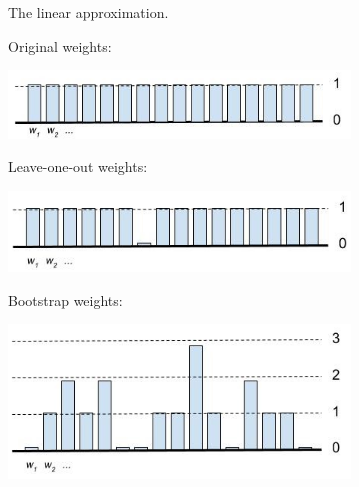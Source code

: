 



\begin{frame}{The linear approximation.}
%
%

\begin{minipage}{0.49\textwidth}
     {
    Original weights: \par
    \includegraphics[width=0.68\textwidth]{static_figures/orig_weights}
    }
     {
    \par Leave-one-out weights: \par
    \includegraphics[width=0.68\textwidth]{static_figures/weights_loo}
    }
     {
    \par Bootstrap weights: \par
    \includegraphics[width=0.68\textwidth]{static_figures/boot_weights}
    }
\end{minipage}
\begin{minipage}{0.49\textwidth}

\end{minipage}
\end{frame}
